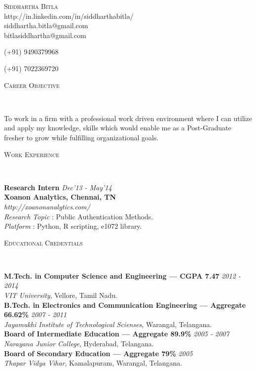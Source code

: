 \documentclass[9pt]{article}
\newenvironment{changemargin}[2]{%
  \begin{list}{}{%
    \setlength{\topsep}{0pt}%
    \setlength{\leftmargin}{#1}%
    \setlength{\rightmargin}{#2}%
    \setlength{\listparindent}{\parindent}%
    \setlength{\itemindent}{\parindent}%
    \setlength{\parsep}{\parskip}%
  }%
  \item[]}{\end{list}
}
\newcommand{\lineover}{
	\begin{changemargin}{-0.05in}{-0.05in}
		\vspace*{-8pt}
		\hrulefill \\
		\vspace*{-2pt}
	\end{changemargin}
}
\newcommand{\header}[1]{
	\begin{changemargin}{-0.5in}{-0.5in}
		\scshape{#1}\\
  	\lineover
	\end{changemargin}
}
\newcommand{\contact}[4]{
	\begin{changemargin}{-0.5in}{-0.5in}
		\begin{center}
			{\Large \scshape {#1}}\\ \smallskip
			{#2}\\ \smallskip 
			{#3}\\ \smallskip
			{#4}\smallskip
		\end{center}
	\end{changemargin}
}
\newenvironment{body} {
	\vspace*{-16pt}
	\begin{changemargin}{-0.25in}{-0.5in}
  }	
	{\end{changemargin}
}
\begin{document}
\contact{Siddhartha Bitla}{http://in.linkedin.com/in/siddharthabitla/}{siddhartha.bitla@gmail.com}{bitlasiddhartha@gmail.com}  \centerline{(+91) 9490379968} \centerline{(+91) 7022369720} 

\smallskip
\header{Career Objective}

\begin{body}
	\vspace{14pt}
	To work in a firm with a professional work driven environment where I can utilize and apply my knowledge, skills which would enable me as a Post-Graduate fresher to grow while fulfilling organizational goals.
\end{body}

\smallskip

\header{Work Experience}

\begin{body}
	\vspace{14pt}
	\textbf{Research Intern}{} \hfill \emph{Dec'13 - May'14} \\
	\textbf{Xoanon Analytics, Chennai, TN}{} \\
	\emph{http://xoanonanalytics.com/} \\
	\textit{Research Topic} : Public Authentication Methods. \\
	\textit{Platform} : Python, R scripting, e1072 library.\\
\end{body}

\smallskip

\header{Educational Credentials}

\begin{body}
	\vspace{14pt}
	\textbf{M.Tech. in Computer Science and Engineering --- CGPA 7.47}{} \hfill \emph{2012 - 2014}{} \\
	\emph{VIT University}, Vellore, Tamil Nadu{}. \\
  \medskip
	\textbf{B.Tech. in Electronics and Communication Engineering --- Aggregate 66.62\%} \hfill \emph{2007 - 2011} \\
	\emph{Jayamukhi Institute of Technological Scienses}, Warangal, Telangana{}.\\
	\medskip
	\textbf{Board of Intermediate Education --- Aggregate 89.9\%} \hfill \emph{2005 - 2007}{} \\
	\emph{Narayana Junior College}, Hyderabad, Telangana{}. \\
	\medskip
	\textbf{Board of Secondary Education --- Aggregate 79\%} \hfill \emph{2005}{} \\
	\emph{Thapar Vidya Vihar}, Kamalapuram, Warangal, Telangana{}. \\

\end{body}
\end{document}
